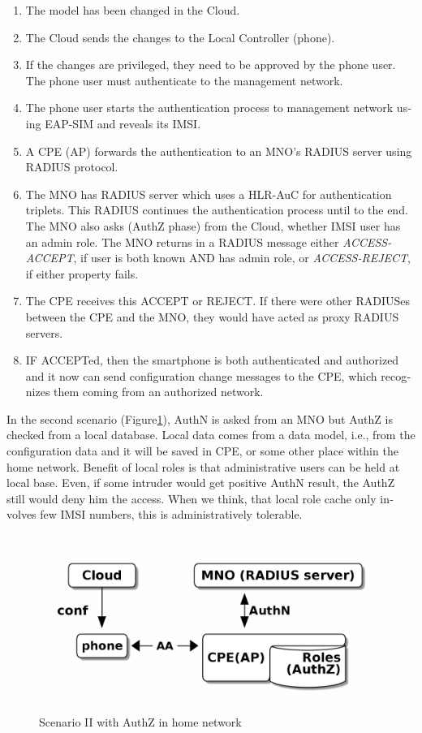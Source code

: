 \documentclass[12pt,a4paper,english]{tutthesis}
\begin{document}
\begin{otherlanguage}{english}
\begin{enumerate}
\item The model has been changed in the Cloud.
\item The Cloud sends the changes to the Local Controller (phone).
\item If the changes are privileged, they need to be approved by the
phone user.  The phone user must authenticate to the management
network.
\item The phone user starts the authentication process to management
network using EAP-SIM and reveals its IMSI.
\item A CPE (AP) forwards the authentication to an MNO's RADIUS server
using RADIUS protocol.
\item The MNO has RADIUS server which uses a HLR-AuC for authentication
triplets. This RADIUS continues the authentication process until to
the end. The MNO also asks (AuthZ phase) from the Cloud, whether
IMSI user has an admin role.  The MNO returns in a RADIUS message
either \emph{ACCESS-ACCEPT}, if user is both known AND has admin role,
or \emph{ACCESS-REJECT}, if either property fails.
\item The CPE receives this ACCEPT or REJECT. If there were other
RADIUSes between the CPE and the MNO, they would have acted as
proxy RADIUS servers.
\item IF ACCEPTed, then the smartphone is both authenticated and
authorized and it now can send configuration change messages to the
CPE, which recognizes them coming from an authorized network.
\end{enumerate}






\label{scenario-ii}

In the second scenario (Figure\ref{fig:scenario-II}), AuthN is asked from an MNO but
AuthZ is checked from a local database. Local data comes from a data
model, i.e., from the configuration data and it will be saved in CPE,
or some other place within the home network. Benefit of local roles is
that administrative users can be held at local base. Even, if some
intruder would get positive AuthN result, the AuthZ still would deny
him the access. When we think, that local role cache only involves few
IMSI numbers, this is administratively tolerable.


\begin{figure}[htb]
\centering
\includegraphics[width=.9\linewidth]{scenII.png}
\caption{\label{fig:scenario-II}Scenario II with AuthZ in home network}
\end{figure}



\end{otherlanguage}
\end{document}
